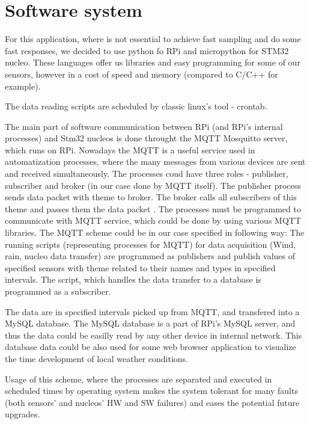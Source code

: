 
\section{Software system}
For this application, where is not essential to achieve fast sampling and do some fast responses, we decided to use python fo RPi and micropython for STM32 nucleo. These languages offer us libraries and easy programming for some of our sensors, however in a cost of speed and memory (compared to C/C++ for example).
\par
The data reading scripts are scheduled by classic linux's tool - crontab.


\par
The main part of software communication between RPi (and RPi's internal processes) and Stm32 nucleos is done throught the MQTT Mosquitto server, which runs on RPi. Nowadays the MQTT is a useful service used in automatization processes, where the many messages from various devices are sent and received simultaneously. The processes coud have three roles - publisher, subscriber and broker (in our case done by MQTT itself). The publisher process sends data packet with theme to broker. The broker calls all subscribers of this theme and passes them the data packet \cite{MqttServ}. The processes must be programmed to communicate with MQTT service, which could be done by using various MQTT libraries. The MQTT scheme could be in our case specified in following way: The running scripts (representing processes for MQTT) for data acquisition (Wind, rain, nucleo data transfer) are programmed as publishers and publish values of specified sensors with theme related to their names and types in specified intervals. The script, which handles the data transfer to a database is programmed as a subscriber.


\par
The data are in specified intervals picked up from MQTT, and transfered into a MySQL database. The MySQL database is a part of RPi's MySQL server, and thus the data could be easilly read by any other device in internal network. This database data could be also used for some web browser application to visualize the time development of local weather conditions.

\par

Usage of this scheme, where the processes are separated and executed in scheduled times by operating system makes the system tolerant for many faults (both sensors' and nucleos' HW and SW failures) and eases the potential future upgrades.


